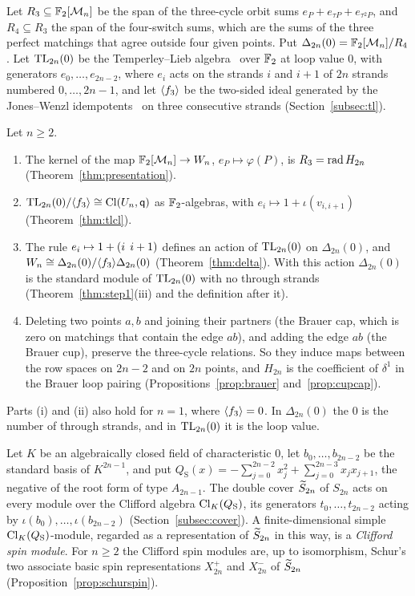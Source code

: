 Let $R_3\subseteq\mathbb{F}_2[\mathcal{M}_n]$ be the span of the three-cycle orbit sums $e_P+e_{\tau P}+e_{\tau^{2}P}$, and $R_4\subseteq R_3$ the span of the four-switch sums, which are the sums of the three perfect matchings that agree outside four given points. Put $\Delta_{2n}(0)=\mathbb{F}_2[\mathcal{M}_n]/R_4$. Let $\mathrm{TL}_{2n}(0)$ be the Temperley--Lieb algebra~\cite{Jones83,TL71} over $\mathbb{F}_2$ at loop value $0$, with generators $e_0,\dots,e_{2n-2}$, where $e_i$ acts on the strands $i$ and $i+1$ of $2n$ strands numbered $0,\dots,2n-1$, and let $\langle f_3\rangle$ be the two-sided ideal generated by the Jones--Wenzl idempotents~\cite{Wenzl87} on three consecutive strands (Section~\ref{subsec:tl}). %

\begin{mainthm}\label{mthm:B}
Let $n\ge2$.
\begin{enumerate}
\item The kernel of the map $\mathbb{F}_2[\mathcal{M}_n]\to W_n$, $e_P\mapsto\varphi(P)$, is $R_3=\operatorname{rad} H_{2n}$ \textup{(Theorem~\ref{thm:presentation})}.
\item $\mathrm{TL}_{2n}(0)/\langle f_3\rangle\cong\operatorname{Cl}(U_n,\mathsf{q})$ as $\mathbb{F}_2$-algebras, with $e_i\mapsto1+\iota(v_{i,i+1})$ \textup{(Theorem~\ref{thm:tlcl})}.
\item The rule $e_i\mapsto1+(i\;\,i+1)$ defines an action of $\mathrm{TL}_{2n}(0)$ on $\Delta_{2n}(0)$, and $W_n\cong\Delta_{2n}(0)/\langle f_3\rangle\Delta_{2n}(0)$ \textup{(Theorem~\ref{thm:delta})}. With this action $\Delta_{2n}(0)$ is the standard module of $\mathrm{TL}_{2n}(0)$ with no through strands \textup{(Theorem~\ref{thm:step1}(iii) and the definition after it)}.
\item Deleting two points $a,b$ and joining their partners (the Brauer cap, which is zero on matchings that contain the edge $ab$), and adding the edge $ab$ (the Brauer cup), preserve the three-cycle relations. So they induce maps between the row spaces on $2n-2$ and on $2n$ points, and $H_{2n}$ is the coefficient of $\delta^1$ in the Brauer loop pairing \textup{(Propositions~\ref{prop:brauer} and~\ref{prop:cupcap})}.
\end{enumerate}
\end{mainthm}

Parts (i) and (ii) also hold for $n=1$, where $\langle f_3\rangle=0$. In $\Delta_{2n}(0)$ the $0$ is the number of through strands, and in $\mathrm{TL}_{2n}(0)$ it is the loop value.

Let $K$ be an algebraically closed field of characteristic $0$, let $b_0,\dots,b_{2n-2}$ be the standard basis of $K^{2n-1}$, and put $Q_{\mathrm S}(x)=-\sum_{j=0}^{2n-2}x_j^2+\sum_{j=0}^{2n-3}x_{j}x_{j+1}$, the negative of the root form of type $A_{2n-1}$. The double cover $\widetilde{S}_{2n}$ of $S_{2n}$ acts on every module over the Clifford algebra $\operatorname{Cl}_K(Q_{\mathrm S})$, its generators $t_0,\dots,t_{2n-2}$ acting by $\iota(b_0),\dots,\iota(b_{2n-2})$ (Section~\ref{subsec:cover}). A finite-dimensional simple $\operatorname{Cl}_K(Q_{\mathrm S})$-module, regarded as a representation of $\widetilde{S}_{2n}$ in this way, is a \emph{Clifford spin module}. For $n\ge2$ the Clifford spin modules are, up to isomorphism, Schur's two associate basic spin representations $X_{2n}^+$ and $X_{2n}^-$ of $\widetilde{S}_{2n}$ (Proposition~\ref{prop:schurspin}).

